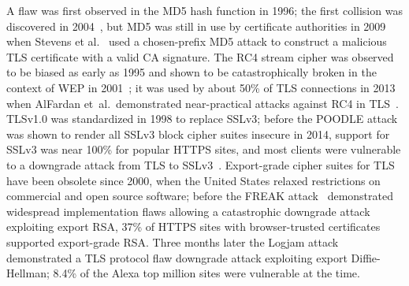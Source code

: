 A flaw was first observed in the MD5 hash function in 1996; the first
collision was discovered in 2004~\cite{Wang:2005:BMO:2154598.2154601}, but
MD5 was still in use by certificate authorities in 2009 when Stevens et
al.~\cite{Stevens2009} used a chosen-prefix MD5 attack to construct a
malicious TLS certificate with a valid CA signature. The RC4 stream cipher
was observed to be biased as early as 1995 and shown to be catastrophically
broken in the context of WEP in 2001~\cite{Fluhrer2001}; it was used by about
50\% of TLS connections in 2013 when AlFardan et~al.\ demonstrated
near-practical attacks against RC4 in TLS~\cite{RC4biases}. TLSv1.0 was
standardized in 1998 to replace SSLv3; before the POODLE attack~\cite{POODLE}
was shown to render all SSLv3 block cipher suites insecure in 2014, support
for SSLv3 was near 100\% for popular HTTPS sites, and most clients were
vulnerable to a downgrade attack from TLS to SSLv3~\cite{ssllabs}.
Export-grade cipher suites for TLS have been obsolete since 2000, when the
United States relaxed restrictions on commercial and open source software;
before the FREAK attack~\cite{SMACKTLS} demonstrated widespread
implementation flaws allowing a catastrophic downgrade attack exploiting
export RSA, 37\% of HTTPS sites with browser-trusted certificates supported
export-grade RSA\@. Three months later the Logjam attack~\cite{logjam-2015}
demonstrated a TLS protocol flaw downgrade attack exploiting export
Diffie-Hellman; 8.4\% of the Alexa top million sites were vulnerable at the
time.

